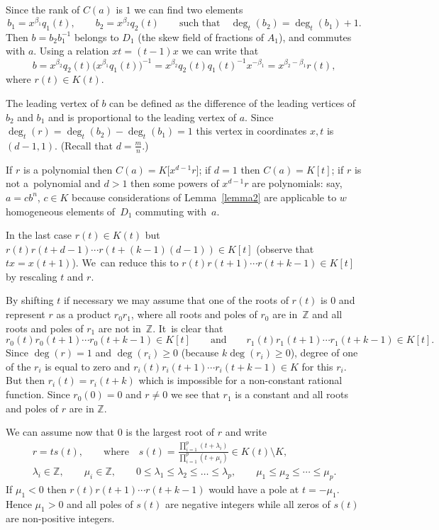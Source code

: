 \documentclass[pdftex]{sigma}
\numberwithin{equation}{section}
\newcommand{\Z}{\mathbb Z}
\newcommand{\be}{\beta}
\newcommand{\la}{\lambda}
\begin{document}
Since the rank of $C(a)$ is $1$ we can find two elements
\[
b_1 = x^{\be_1}q_1(t), \qquad
b_2 = x^{\be_2}q_2(t)\qquad
\text{such that}\quad
\deg_t(b_2) = \deg_t(b_1) + 1.
\]
Then $b = b_2b_1^{-1}$ belongs to $D_1$ (the skew field of fractions of $A_1$), and commutes with $a$. Using a relation $xt = (t-1)x$ we can write that
\[
b = x^{\be_2}q_2(t)\big(x^{\be_1}q_1(t)\big)^{-1} = x^{\be_2}q_2(t)q_1(t)^{-1}x^{-\be_1} = x^{\be_2-\be_1}r(t),
\]
where $r(t) \in K(t)$.

The leading vertex of $b$ can be defined as the difference of the leading vertices of $b_2$ and $b_1$ and is proportional to the leading vertex of $a$. Since $\deg_t(r) = \deg_t(b_2) - \deg_t(b_1) = 1$ this vertex in coordinates $x, t$ is $(d-1,1)$. (Recall that $d = \frac{m}{n}$.)

If $r$ is a polynomial then $C(a) = K\big[x^{d-1}r\big]$; if $d = 1$ then $C(a) = K[t]$; if $r$ is not a~polynomial and $d > 1$ then some powers of $x^{d-1}r$ are polynomials: say, $a = cb^n$, $c\in K$ because considerations of Lemma~\ref{lemma2} are applicable to $w$ homogeneous elements of~$D_1$ commuting with~$a$.

In the last case
$r(t) \in K(t)$ but $r(t)r(t+d - 1)\cdots r(t + (k-1)(d-1)) \in K[t]$ (observe that $tx = x(t + 1)$). We~can reduce this to $r(t)r(t+1)\cdots r(t + k -1) \in K[t]$ by rescaling $t$ and $r$.

By shifting $t$ if necessary we may assume that one of the roots of $r(t)$ is
$0$ and represent $r$ as a product
$r_0r_1$, where all roots and poles of $r_0$ are
in~$\Z$ and all roots and poles of $r_1$ are not in~$\Z$. It~is clear that
\[
r_0(t)r_0(t+1)\cdots r_0(t + k -1) \in K[t]\qquad \text{and}\qquad
r_1(t)r_1(t+1)\cdots r_1(t + k-1) \in K[t].
\]
Since $\deg(r) = 1$ and $\deg(r_i) \geq 0$ (because $k\deg(r_i)
\geq 0$), degree of one of the $r_i$ is equal to zero and
$r_i(t)r_i(t+1)\cdots r_i(t + k - 1) \in K$ for this $r_i$. But then $r_i(t) = r_i(t + k)$
which is impossible for a
non-constant rational function. Since $r_0(0) = 0$ and $r \neq 0$ we see that
$r_1$ is a constant and all roots and poles of $r$ are in $\Z$.

We can assume now that $0$ is the largest root of $r$ and write
\begin{gather*}
r = ts(t),\qquad
\text{where}\quad
s(t) = \frac{\prod_{i=1}^p (t + \la_i)}{\prod_{i=1}^p (t + \mu_i)} \in
K(t) \setminus K,
\\
\la_i \in \Z, \qquad
\mu_i \in \Z,\qquad
0 \leq \la_1 \leq \la_2 \leq \dots \leq \la_p, \qquad
\mu_1\leq \mu_2 \leq \cdots \leq \mu_p.
\end{gather*}
If $\mu_1 < 0$ then $r(t)r(t+1)\cdots r(t + k -1)$
would have a pole at $t = -\mu_1$. Hence $\mu_1 > 0$ and all poles of $s(t)$
are negative integers while all zeros of $s(t)$ are non-positive integers.
\end{document}
